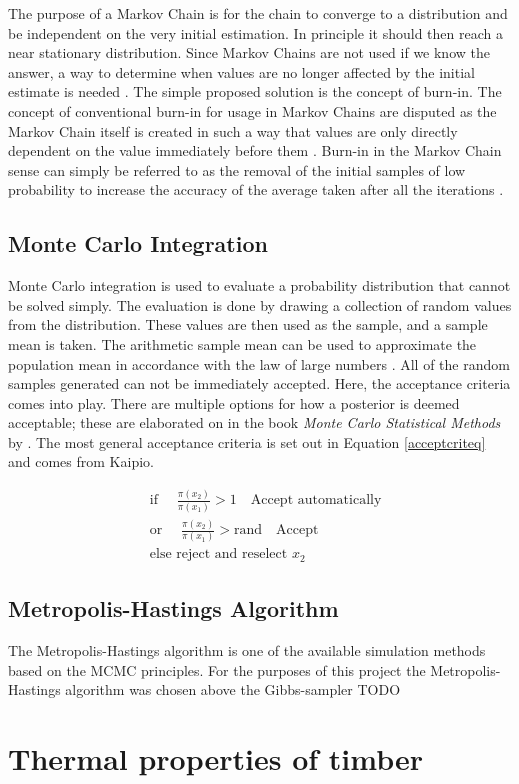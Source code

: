 	The purpose of a Markov Chain is for the chain to converge to a distribution and be independent on the very initial estimation. 
	In principle it should then reach a near stationary distribution.
	Since Markov Chains are not used if we know the answer, a way to determine when values are no longer affected by the initial estimate is needed \cite{Gilks:1996}. 
	The simple proposed solution is the concept of burn-in. 
	The concept of conventional burn-in for usage in Markov Chains are disputed as the Markov Chain itself is created in such a way that values are only directly dependent on the value immediately before them \cite{Meyn:1993}.
	Burn-in in the Markov Chain sense can simply be referred to as the removal of the initial samples of low probability to increase the accuracy of the average taken after all the iterations \cite{John:2016}.
	
	
	
		
	\subsection{Monte Carlo Integration}\label{MCint_sec}
	Monte Carlo integration is used to evaluate a probability distribution that cannot be solved simply. 
	The evaluation is done by drawing a collection of random values from the distribution.
	These values are then used as the sample, and a sample mean is taken.
	The arithmetic sample mean can be used to approximate the population mean in accordance with the law of large numbers \citep{Gilks:1996}.
	All of the random samples generated can not be immediately accepted.
	Here, the acceptance criteria comes into play.
	There are multiple options for how a posterior is deemed acceptable; these are elaborated on in the book  \textit{Monte Carlo Statistical Methods} by \citeauthor{Robert:2004}. 
	The most general acceptance criteria is set out in Equation \ref{acceptcriteq} and comes from Kaipio.
	
		\begin{equation} \label{acceptcriteq}
		\begin{aligned}
		&\text{if  }\quad \frac{\pi (x_2)}{\pi(x_1)} > 1 \quad \text{Accept automatically}\\
		&\text{or  }\quad \frac{\pi (x_2)}{\pi(x_1)} > \text{rand}  \quad \text{Accept}\\
		&\text{else reject and reselect  } x_2
		\end{aligned}
		\end{equation}
	

\subsection{Metropolis-Hastings Algorithm}

The Metropolis-Hastings algorithm is one of the available simulation methods based on the MCMC principles. 
For the purposes of this project the Metropolis-Hastings algorithm was chosen above the Gibbs-sampler TODO


\section{Thermal properties of timber}
